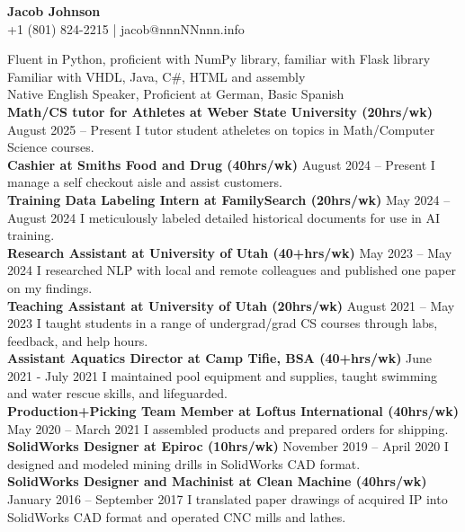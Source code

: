 \documentclass[a4paper,10pt]{article}
\newcommand{\resumeSection}[1]{\vspace{2pt}\noindent{\Large \textbf{#1}}\vspace{1pt}\newline}
\newcommand{\resumeSubsection}[2]{\noindent\textbf{#1} \hfill #2\newline}
\begin{document}
\begin{center}
    {\LARGE \textbf{Jacob Johnson}} \\
    \vspace{2pt}
    +1 (801) 824-2215  | jacob@nnnNNnnn.info
\end{center}

\resumeSection{Overview}
    Fluent in Python, proficient with NumPy library, familiar with Flask library \\
    Familiar with VHDL, Java, C\#, HTML and assembly \\
    Native English Speaker, Proficient at German, Basic Spanish \\

\resumeSection{Work Experience}
    \resumeSubsection{Math/CS tutor for Athletes at Weber State University (20hrs/wk)}{August 2025 -- Present}
        I tutor student atheletes on topics in Math/Computer Science courses. \\
    \resumeSubsection{Cashier at Smiths Food and Drug (40hrs/wk)}{August 2024 -- Present}
        I manage a self checkout aisle and assist customers. \\
    \resumeSubsection{Training Data Labeling Intern at FamilySearch (20hrs/wk)}{May 2024 -- August 2024}
        I meticulously labeled detailed historical documents for use in AI training. \\
    \resumeSubsection{Research Assistant at University of Utah (40+hrs/wk)}{May 2023 -- May 2024}
        I researched NLP with local and remote colleagues and published one paper on my findings. \\
    \resumeSubsection{Teaching Assistant at University of Utah (20hrs/wk)}{August 2021 -- May 2023}
        I taught students in a range of undergrad/grad CS courses through labs, feedback, and help hours. \\
    \resumeSubsection{Assistant Aquatics Director at Camp Tifie, BSA (40+hrs/wk)}{June 2021 - July 2021}
        I maintained pool equipment and supplies, taught swimming and water rescue skills, and lifeguarded. \\
    \resumeSubsection{Production+Picking Team Member at Loftus International (40hrs/wk)}{May 2020 -- March 2021}
        I assembled products and prepared orders for shipping. \\
    \resumeSubsection{SolidWorks Designer at Epiroc (10hrs/wk)}{November 2019 -- April 2020}    
        I designed and modeled mining drills in SolidWorks CAD format. \\
    \resumeSubsection{SolidWorks Designer and Machinist at Clean Machine (40hrs/wk)}{January 2016 -- September 2017}
        I translated paper drawings of acquired IP into SolidWorks CAD format and operated CNC mills and lathes. \\
\end{document}
